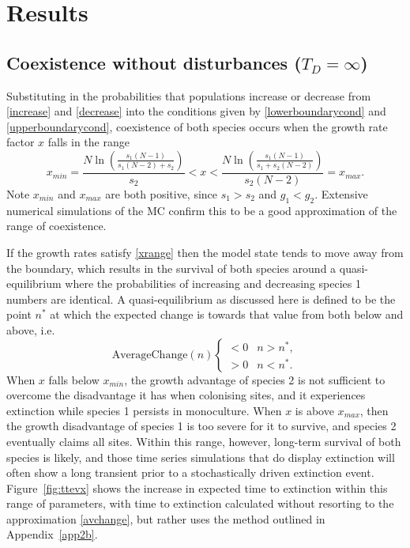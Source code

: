 \section{Results} \label{results}
\subsection{Coexistence without disturbances ($T_D=\infty$)}
\label{ss:resultshomo}

Substituting in the probabilities that populations increase or decrease from \eqref{increase} and \eqref{decrease} into the conditions given by \eqref{lowerboundarycond} and \eqref{upperboundarycond}, coexistence of both species occurs when the growth rate factor $x$ falls in the range
\begin{equation}
\label{xrange}
x_{min}=\frac{N\ln\left(\frac{s_1(N-1)}{s_1(N-2)+s_2}\right)}{s_2}<x<\frac{N\ln\left(\frac{s_1(N-1)}{s_1+s_2(N-2)}\right)}{s_2(N-2)}=x_{max}.
\end{equation}
Note $x_{min}$ and $x_{max}$ are both positive, since $s_1>s_2$ and $g_1<g_2$.  Extensive numerical simulations of the MC confirm this to be a good approximation of the range of coexistence.

If the growth rates satisfy \eqref{xrange} then the model state tends to move away from the boundary, which results in  the survival of both species around a quasi-equilibrium where the probabilities of increasing and decreasing species 1 numbers are identical. A quasi-equilibrium as discussed here is defined to be the point $n^*$ at which the expected change is towards that value from both below and above, i.e.
\begin{equation}
\text{AverageChange}(n)\begin{cases}
<0 & n>n^*, \\
>0 & n<n^*. \end{cases} \end{equation}
 When $x$ falls below $x_{min}$, the growth advantage of species 2 is not sufficient to overcome the disadvantage it has when colonising sites, and it experiences extinction while species 1 persists in monoculture. When $x$ is above $x_{max}$, then the growth disadvantage of species 1 is too severe for it to survive, and species 2 eventually claims all sites. Within this range, however, long-term survival of both species is likely, and those time series simulations that do display extinction will often show a long transient prior to a stochastically driven extinction event. Figure~\ref{fig:ttevx} shows the increase in expected time to extinction within this range of parameters, with time to extinction calculated without resorting to the approximation \eqref{avchange}, but rather uses the method outlined in Appendix~\ref{app2b}.

